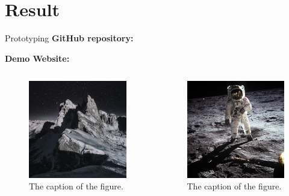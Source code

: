 \documentclass{beamer}
\begin{document}
\section{Result} 
			
\begin{frame}{Prototyping}
	\textbf{GitHub repository:} \url{}
																
	\textbf{Demo Website:} \url{}
							
	\begin{columns}
		\begin{figure}
			\centering
			\includegraphics[width=.8\textwidth]{samples1.png}
			\caption{The caption of the figure.}
		\end{figure}	
		\begin{figure}
			\centering
			\includegraphics[width=.8\textwidth]{samples2.png}
			\caption{The caption of the figure.}
		\end{figure}
	\end{columns}
	\note{}
\end{frame}
\end{document}
